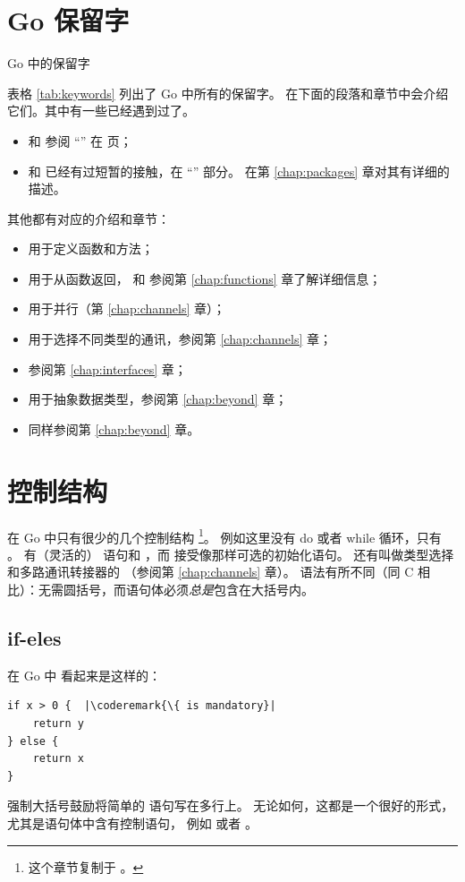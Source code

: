 \section{Go 保留字}
\begin{table}[H]
\begin{center}
\caption{Go 中的保留字}
\label{tab:keywords}

\end{center}
\end{table}
表格 \ref{tab:keywords} 列出了 Go 中所有的保留字。
在下面的段落和章节中会介绍它们。其中有一些已经遇到过了。
\begin{itemize}
\item {} 和  参阅 ``'' 在 \pageref{sec:vars} 页；
\item {} 和  已经有过短暂的接触，在 ``'' 部分。 
在第 \ref{chap:packages} 章对其有详细的描述。
\end{itemize}
其他都有对应的介绍和章节：
\begin{itemize}
\item {} 用于定义函数和方法；
\item {} 用于从函数返回， 和 
参阅第 \ref{chap:functions} 章了解详细信息；
\item {} 用于并行（第 \ref{chap:channels} 章）；
\item {} 用于选择不同类型的通讯，参阅第 \ref{chap:channels} 章；
\item {} 参阅第 \ref{chap:interfaces} 章；
\item {} 用于抽象数据类型，参阅第 \ref{chap:beyond} 章；
\item {} 同样参阅第 \ref{chap:beyond} 章。
\end{itemize}

\section{控制结构}
在 Go 中只有很少的几个控制结构
\footnote{这个章节复制于 \cite{effective_go}。}。
例如这里没有 do 或者 while 循环，只有 。
有（灵活的） 语句和 ，而
 接受像那样可选的初始化语句。
还有叫做类型选择和多路通讯转接器的  （参阅第 \ref{chap:channels} 章）。
语法有所不同（同 C 相比）：无需圆括号，而语句体必须\emph{总是}包含在大括号内。

\subsection{if-eles}
在 Go 中  看起来是这样的：
\begin{lstlisting}
if x > 0 {	|\coderemark{\{ is mandatory}|
    return y
} else {
    return x
}
\end{lstlisting}
强制大括号鼓励将简单的  语句写在多行上。
无论如何，这都是一个很好的形式，尤其是语句体中含有控制语句，
例如  或者 。

